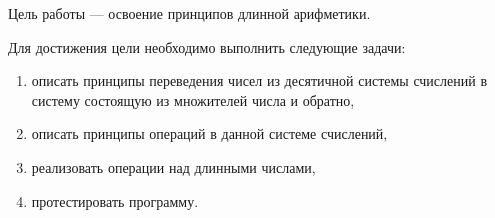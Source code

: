 Цель работы --- освоение принципов длинной арифметики.

Для достижения цели необходимо выполнить следующие задачи:
\begin{enumerate}
\item описать принципы переведения чисел из десятичной системы счислений в систему состоящую из множителей числа и обратно, 
\item описать принципы операций в данной системе счислений,
\item реализовать операции над длинными числами,
\item протестировать программу.
\end{enumerate}
\clearpage
